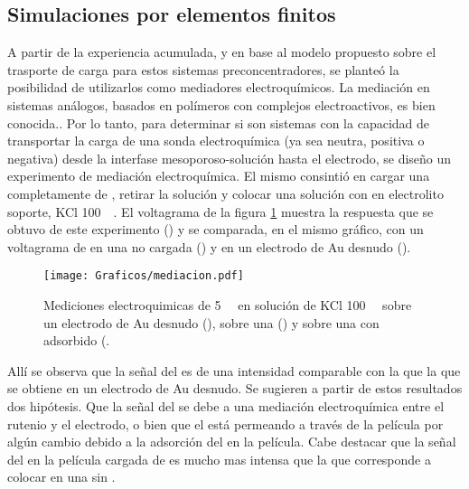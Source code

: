 	\subsection{Simulaciones por elementos finitos}	

		A partir de la experiencia acumulada, y en base al modelo propuesto sobre el trasporte de carga para estos sistemas preconcentradores, se planteó la posibilidad de utilizarlos como mediadores electroquímicos. 
    	La mediación en sistemas análogos, basados en polímeros con complejos electroactivos, es bien conocida.\cite{Kolb1993,Ybarra2005}. Por lo tanto, para determinar si son sistemas con la capacidad de transportar la carga de una sonda electroquímica (ya sea neutra, positiva o negativa) desde la interfase mesoporoso-solución hasta el electrodo, se diseño un experimento de mediación electroquímica. El mismo consintió en cargar una \pdmF\space completamente de \ru, retirar la solución y colocar una solución con \fc en electrolito soporte, KCl \SI{100}{\milli\Molar}. El voltagrama de la figura \ref{fig:mediacion} muestra la respuesta que se obtuvo de este experimento (\usebox{\verde}) y se comparada, en el mismo gráfico, con un voltagrama de \fc\space en una \pdmF\space no cargada (\usebox{\azul}) y en un electrodo de Au desnudo (\usebox{\rojo}).  

        	\begin{figure}[ht]	
					\centering
			 	    \texttt{[image: Graficos/mediacion.pdf]}
			        \caption[Voltagrama de \ru\space y \fc.]{Mediciones electroquimicas de \fc\space \SI{5}{\milli\Molar} en solución de KCl \SI{100}{\milli\Molar} sobre un electrodo de Au desnudo (\usebox{\rojo}), sobre una \pdmF\space (\usebox{\azul}) y sobre una \pdmF\space con \ru\space adsorbido (\usebox{\verde}.}
			        \label{fig:mediacion}
			      	\end{figure}

		Allí se observa que la señal del \fc\space es de una intensidad comparable con la que la que se obtiene en un electrodo de Au desnudo. Se sugieren a partir de estos resultados dos hipótesis. Que la señal del \fc\space se debe a una mediación electroquímica entre el rutenio y el electrodo, o bien que  el \fc\space está permeando a través de la película por algún cambio debido a la adsorción del \ru\space en la película. Cabe destacar que la señal del \fc\space en la película cargada de \ru\space es mucho mas intensa que la que corresponde a colocar \fc\space en una \pdmF\space sin \ru.

